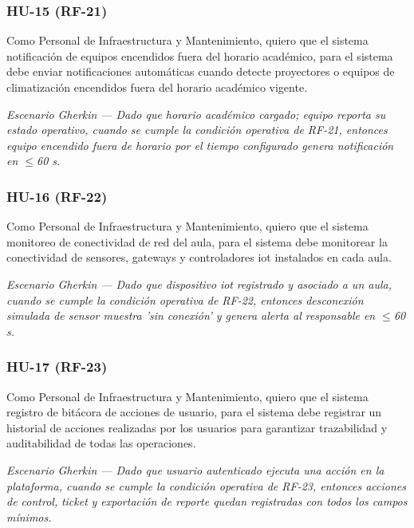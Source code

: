 \subsubsection*{HU-15 (RF-21)}


Como Personal de Infraestructura y Mantenimiento, quiero que el sistema notificación de equipos encendidos fuera del horario académico, para el sistema debe enviar notificaciones automáticas cuando detecte proyectores o equipos de climatización encendidos fuera del horario académico vigente.


\textit{Escenario }\textit{Gherkin}\textit{ --- Dado que horario académico cargado; equipo reporta su estado operativo, cuando se cumple la condición operativa de RF-21, entonces equipo encendido fuera de horario por el tiempo configurado genera notificación en $\leq$60 s.}


\subsubsection*{HU-16 (RF-22)}


Como Personal de Infraestructura y Mantenimiento, quiero que el sistema monitoreo de conectividad de red del aula, para el sistema debe monitorear la conectividad de sensores, gateways y controladores iot instalados en cada aula.


\textit{Escenario }\textit{Gherkin}\textit{ --- Dado que dispositivo }\textit{iot}\textit{ registrado y asociado a un aula, cuando se cumple la condición operativa de RF-22, entonces desconexión simulada de sensor muestra 'sin conexión' y genera alerta al responsable en $\leq$60 s.}


\subsubsection*{HU-17 (RF-23)}


Como Personal de Infraestructura y Mantenimiento, quiero que el sistema registro de bitácora de acciones de usuario, para el sistema debe registrar un historial de acciones realizadas por los usuarios para garantizar trazabilidad y auditabilidad de todas las operaciones.


\textit{Escenario }\textit{Gherkin}\textit{ --- Dado que usuario autenticado ejecuta una acción en la plataforma, cuando se cumple la condición operativa de RF-23, entonces acciones de control, }\textit{ticket}\textit{ y exportación de reporte quedan registradas con todos los campos mínimos.}


